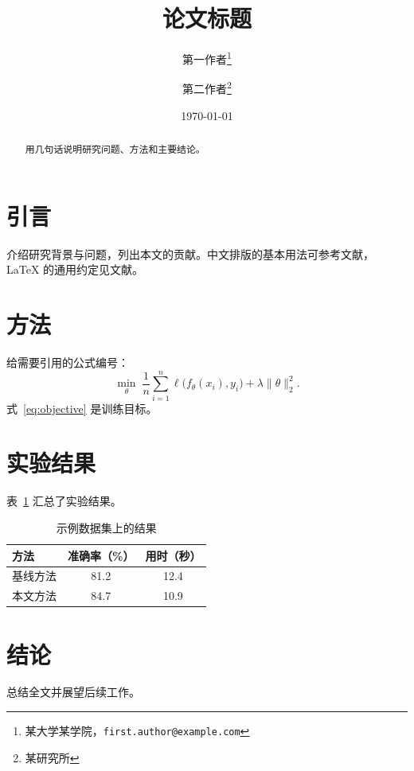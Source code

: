 \documentclass[UTF8,fontset=fandol,zihao=-4,a4paper]{ctexart}
\title{论文标题}
\author{第一作者\thanks{某大学某学院，\texttt{first.author@example.com}} \and 第二作者\thanks{某研究所}}
\date{\today}
\begin{document}
\maketitle

\begin{abstract}
用几句话说明研究问题、方法和主要结论。
\end{abstract}

\section{引言}
介绍研究背景与问题，列出本文的贡献。中文排版的基本用法可参考文献\cite{liu2013latex}，
\LaTeX{} 的通用约定见文献\cite{lamport1994latex}。

\section{方法}
给需要引用的公式编号：
\begin{equation}
  \label{eq:objective}
  \min_{\theta} \; \frac{1}{n} \sum_{i=1}^{n} \ell\bigl(f_\theta(x_i), y_i\bigr) + \lambda \lVert \theta \rVert_2^2 .
\end{equation}
式~\eqref{eq:objective} 是训练目标。

\section{实验结果}
表~\ref{tab:results} 汇总了实验结果。

\begin{table}[htbp]
  \centering
  \caption{示例数据集上的结果}
  \label{tab:results}
  \begin{tabular}{lcc}
    \toprule
    方法     & 准确率（\%） & 用时（秒） \\
    \midrule
    基线方法 & 81.2         & 12.4       \\
    本文方法 & 84.7         & 10.9       \\
    \bottomrule
  \end{tabular}
\end{table}

\section{结论}
总结全文并展望后续工作。


\end{document}
